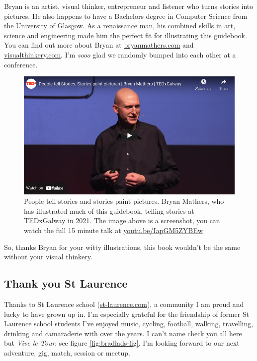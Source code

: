 \documentclass[
]{book}
\begin{document}
Bryan is an artist, visual thinker, entrepreneur and listener who turns stories into pictures. He also happens to have a Bachelors degree in Computer Science from the University of Glasgow. As a renaissance man, his combined skills in art, science and engineering made him the perfect fit for illustrating this guidebook. You can find out more about Bryan at \href{https://bryanmmathers.com}{bryanmathers.com} and \href{https://visualthinkery.com}{visualthinkery.com}. I'm \emph{sooo} glad we randomly bumped into each other at a conference.

\begin{figure}

{\centering \includegraphics[width=1\linewidth]{images/bryan-mathers-tedx-galway} 

}

\caption{People tell stories and stories paint pictures. Bryan Mathers, who has illustrated much of this guidebook, telling stories at TEDxGalway in 2021. The image above is a screenshot, you can watch the full 15 minute talk at \href{https://youtu.be/IapGM5ZYBEw}{youtu.be/IapGM5ZYBEw}}\label{fig:tedx-galway-fig}
\end{figure}



So, thanks Bryan for your witty illustrations, this book wouldn't be the same without your visual thinkery. 🙏

\hypertarget{st-laurence}{%
\subsection{Thank you St Laurence}\label{st-laurence}}

Thanks to St Laurence school (\href{https://st-laurence.com/}{st-laurence.com}), a community I am proud and lucky to have grown up in. I'm especially grateful for the friendship of former St Laurence school students I've enjoyed music, cycling, football, walking, travelling, drinking and camaraderie with over the years. I can't name check you all here but \emph{Vive le Tour}, see figure \ref{fig:bradlads-fig}. I'm looking forward to our next adventure, gig, match, session or meetup.
\end{document}
